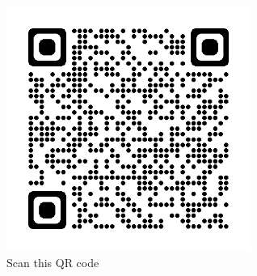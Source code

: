 \begin{figure}[h]
    \centering
    \includegraphics[height=8cm]{images/qrcode2.png}
    \caption*{Scan this QR code}
    \label{fig:figure3}
\end{figure}